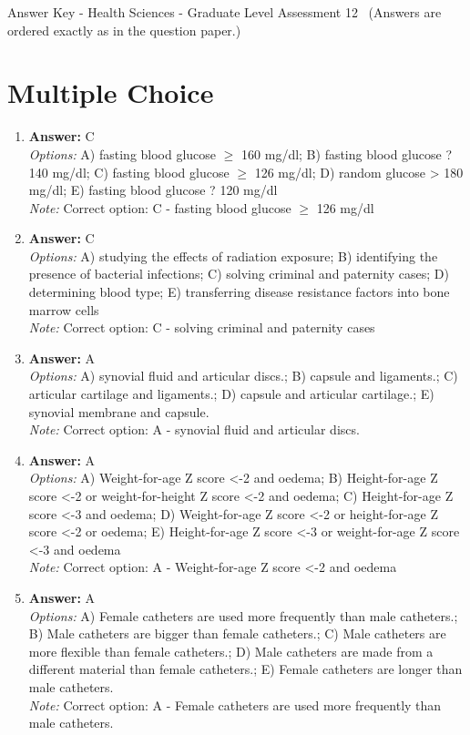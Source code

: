 \documentclass[12pt]{article}
\begin{document}
\begin{center}
Answer Key - Health Sciences - Graduate Level Assessment 12 \
\small (Answers are ordered exactly as in the question paper.)
\end{center}

\section*{Multiple Choice}
\begin{enumerate}[label=\arabic*.]
\item \textbf{Answer:} C
\\ \textit{Options:} A) fasting blood glucose \ensuremath{\geq} 160 mg/dl; B) fasting blood glucose ? 140 mg/dl; C) fasting blood glucose \ensuremath{\geq} 126 mg/dl; D) random glucose \textgreater{} 180 mg/dl; E) fasting blood glucose ? 120 mg/dl
\\ \textit{Note:} Correct option: C - fasting blood glucose \ensuremath{\geq} 126 mg/dl
\item \textbf{Answer:} C
\\ \textit{Options:} A) studying the effects of radiation exposure; B) identifying the presence of bacterial infections; C) solving criminal and paternity cases; D) determining blood type; E) transferring disease resistance factors into bone marrow cells
\\ \textit{Note:} Correct option: C - solving criminal and paternity cases
\item \textbf{Answer:} A
\\ \textit{Options:} A) synovial fluid and articular discs.; B) capsule and ligaments.; C) articular cartilage and ligaments.; D) capsule and articular cartilage.; E) synovial membrane and capsule.
\\ \textit{Note:} Correct option: A - synovial fluid and articular discs.
\item \textbf{Answer:} A
\\ \textit{Options:} A) Weight-for-age Z score \textless{}-2 and oedema; B) Height-for-age Z score \textless{}-2 or weight-for-height Z score \textless{}-2 and oedema; C) Height-for-age Z score \textless{}-3 and oedema; D) Weight-for-age Z score \textless{}-2 or height-for-age Z score \textless{}-2 or oedema; E) Height-for-age Z score \textless{}-3 or weight-for-age Z score \textless{}-3 and oedema
\\ \textit{Note:} Correct option: A - Weight-for-age Z score \textless{}-2 and oedema
\item \textbf{Answer:} A
\\ \textit{Options:} A) Female catheters are used more frequently than male catheters.; B) Male catheters are bigger than female catheters.; C) Male catheters are more flexible than female catheters.; D) Male catheters are made from a different material than female catheters.; E) Female catheters are longer than male catheters.
\\ \textit{Note:} Correct option: A - Female catheters are used more frequently than male catheters.
\end{enumerate}
\end{document}
